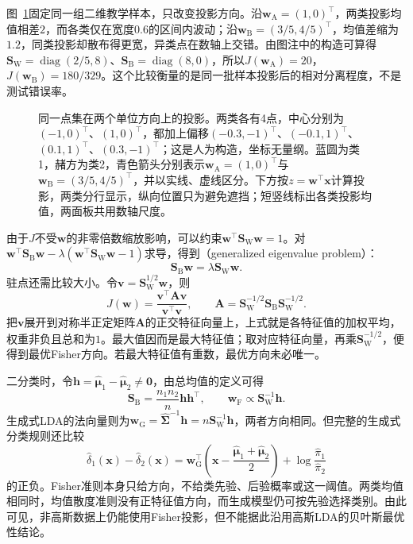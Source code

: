 图~\ref{fig:classification-lda-projection}固定同一组二维教学样本，只改变投影方向。沿$\bm{w}_{\mathrm{A}}=(1,0)^{\top}$，两类投影均值相差$2$，而各类仅在宽度$0.6$的区间内波动；沿$\bm{w}_{\mathrm{B}}=(3/5,4/5)^{\top}$，均值差缩为$1.2$，同类投影却散布得更宽，异类点在数轴上交错。由图注中的构造可算得$\bm{S}_{\mathrm{W}}=\operatorname{diag}(2/5,8)$、$\bm{S}_{\mathrm{B}}=\operatorname{diag}(8,0)$，所以$J(\bm{w}_{\mathrm{A}})=20$，$J(\bm{w}_{\mathrm{B}})=180/329$。这个比较衡量的是同一批样本投影后的相对分离程度，不是测试错误率。

\begin{figure}[htbp]
  \centering
  
  \caption{同一点集在两个单位方向上的投影。两类各有4点，中心分别为$(-1,0)^{\top}$、$(1,0)^{\top}$，都加上偏移$(-0.3,-1)^{\top}$、$(-0.1,1)^{\top}$、$(0.1,1)^{\top}$、$(0.3,-1)^{\top}$；这是人为构造，坐标无量纲。蓝圆为类1，赭方为类2，青色箭头分别表示$\bm{w}_{\mathrm{A}}=(1,0)^{\top}$与$\bm{w}_{\mathrm{B}}=(3/5,4/5)^{\top}$，并以实线、虚线区分。下方按$z=\bm{w}^{\top}\bm{x}$计算投影，两类分行显示，纵向位置只为避免遮挡；短竖线标出各类投影均值，两面板共用数轴尺度。}
  \label{fig:classification-lda-projection}
\end{figure}

由于$J$不受$\bm{w}$的非零倍数缩放影响，可以约束$\bm{w}^{\top}\bm{S}_{\mathrm{W}}\bm{w}=1$。对$\bm{w}^{\top}\bm{S}_{\mathrm{B}}\bm{w}-\lambda(\bm{w}^{\top}\bm{S}_{\mathrm{W}}\bm{w}-1)$求导，得到（generalized eigenvalue problem）：
\begin{equation}
  \label{eq:classification-fisher-eigenproblem}
  \bm{S}_{\mathrm{B}}\bm{w}
    =\lambda\bm{S}_{\mathrm{W}}\bm{w}.
\end{equation}
驻点还需比较大小。令$\bm{v}=\bm{S}_{\mathrm{W}}^{1/2}\bm{w}$，则
\[
  J(\bm{w})=\frac{\bm{v}^{\top}\bm{A}\bm{v}}{\bm{v}^{\top}\bm{v}},
  \qquad
  \bm{A}=\bm{S}_{\mathrm{W}}^{-1/2}
    \bm{S}_{\mathrm{B}}\bm{S}_{\mathrm{W}}^{-1/2}.
\]
把$\bm{v}$展开到对称半正定矩阵$\bm{A}$的正交特征向量上，上式就是各特征值的加权平均，权重非负且总和为$1$。最大值因而是最大特征值；取对应特征向量，再乘$\bm{S}_{\mathrm{W}}^{-1/2}$，便得到最优Fisher方向。若最大特征值有重数，最优方向未必唯一。

二分类时，令$\bm{h}=\hat{\bm{\mu}}_1-\hat{\bm{\mu}}_2\ne\bm{0}$，由总均值的定义可得
\[
  \bm{S}_{\mathrm{B}}=\frac{n_1n_2}{n}\bm{h}\bm{h}^{\top},
  \qquad
  \bm{w}_{\mathrm{F}}\propto\bm{S}_{\mathrm{W}}^{-1}\bm{h}.
\]
生成式LDA的法向量则为$\bm{w}_{\mathrm{G}}=\hat{\bm{\Sigma}}^{-1}\bm{h}=n\bm{S}_{\mathrm{W}}^{-1}\bm{h}$，两者方向相同。但完整的生成式分类规则还比较
\begin{equation}
  \label{eq:classification-lda-binary-threshold}
  \hat\delta_1(\bm{x})-\hat\delta_2(\bm{x})
    =\bm{w}_{\mathrm{G}}^{\top}
      \left(\bm{x}-\frac{\hat{\bm{\mu}}_1+\hat{\bm{\mu}}_2}{2}\right)
      +\log\frac{\hat\pi_1}{\hat\pi_2}
\end{equation}
的正负。Fisher准则本身只给方向，不给类先验、后验概率或这一阈值。两类均值相同时，均值散度准则没有正特征值方向，而生成模型仍可按先验选择类别。由此可见，非高斯数据上仍能使用Fisher投影，但不能据此沿用高斯LDA的贝叶斯最优性结论。

